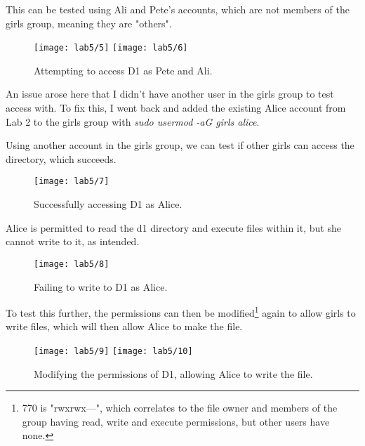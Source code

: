 This can be tested using Ali and Pete's accounts, which are not members of the
girls group, meaning they are "others".

\begin{figure}[H]
    \centering
    \texttt{[image: lab5/5]}
    \texttt{[image: lab5/6]}
    \caption{Attempting to access D1 as Pete and Ali.}
    \label{fig:boysD1}
\end{figure}

\begin{tcolorbox}[colback=orange!5!white,colframe=orange!75!black,title=Note]
    An issue arose here that I didn't have another user in the girls group to test access with.
    To fix this, I went back and added the existing Alice account from Lab 2 to the girls group
    with \textit{sudo usermod -aG girls alice}.
\end{tcolorbox}

Using another account in the girls group, we can test if other girls can access the directory,
which succeeds.

\begin{figure}[H]
    \centering
    \texttt{[image: lab5/7]}
    \caption{Successfully accessing D1 as Alice.}
    \label{fig:girlsD1}
\end{figure}

Alice is permitted to read the d1 directory and execute files
within it, but she cannot write to it, as intended.

\begin{figure}[H]
    \centering
    \texttt{[image: lab5/8]}
    \caption{Failing to write to D1 as Alice.}
    \label{fig:girlsWriteD1Fail}
\end{figure}

To test this further, the permissions can then be modified\footnote{770 is "rwxrwx---", which
correlates to the file owner and members of the group having read, write and execute permissions, but other users have none.}
again to allow girls to write files, which will then allow Alice to make the file.

\begin{figure}[H]
    \centering
    \texttt{[image: lab5/9]}
    \texttt{[image: lab5/10]}
    \caption{Modifying the permissions of D1, allowing Alice to write the file.}
    \label{fig:girlsWriteD1Success}
\end{figure}

\pagebreak

